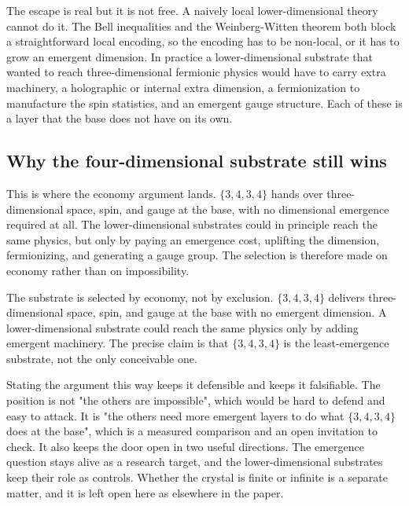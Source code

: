 The escape is real but it is not free. A naively local lower-dimensional theory cannot do it. The Bell
inequalities and the Weinberg-Witten theorem both block a straightforward local encoding, so the encoding has to
be non-local, or it has to grow an emergent dimension. In practice a lower-dimensional substrate that wanted to
reach three-dimensional fermionic physics would have to carry extra machinery, a holographic or internal extra
dimension, a fermionization to manufacture the spin statistics, and an emergent gauge structure. Each of these is
a layer that the base does not have on its own.

\subsection{Why the four-dimensional substrate still wins}

This is where the economy argument lands. $\{3,4,3,4\}$ hands over three-dimensional space, spin, and gauge at the
base, with no dimensional emergence required at all. The lower-dimensional substrates could in principle reach the
same physics, but only by paying an emergence cost, uplifting the dimension, fermionizing, and generating a gauge
group. The selection is therefore made on economy rather than on impossibility.

\begin{principle}
The substrate is selected by economy, not by exclusion. $\{3,4,3,4\}$ delivers three-dimensional space, spin, and
gauge at the base with no emergent dimension. A lower-dimensional substrate could reach the same physics only by
adding emergent machinery. The precise claim is that $\{3,4,3,4\}$ is the least-emergence substrate, not the only
conceivable one.
\end{principle}


Stating the argument this way keeps it defensible and keeps it falsifiable. The position is not "the others are
impossible", which would be hard to defend and easy to attack. It is "the others need more emergent layers to do
what $\{3,4,3,4\}$ does at the base", which is a measured comparison and an open invitation to check. It also
keeps the door open in two useful directions. The emergence question stays alive as a research target, and the
lower-dimensional substrates keep their role as controls. Whether the crystal is finite or infinite is a separate
matter, and it is left open here as elsewhere in the paper.
